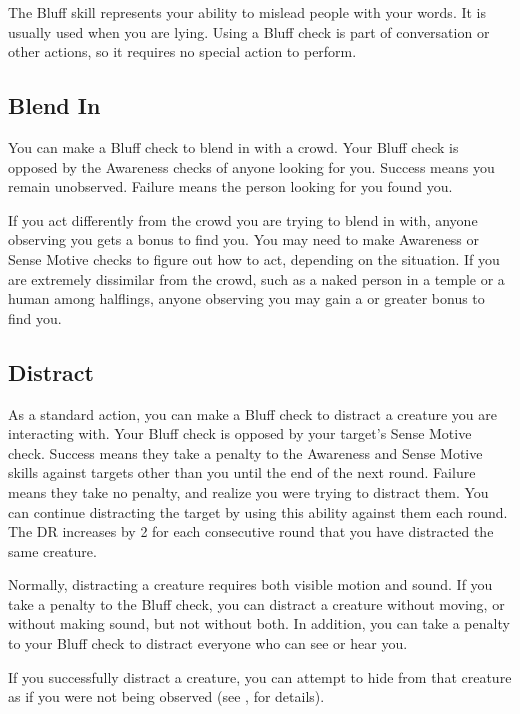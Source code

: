 \newpage
{}
        The Bluff skill represents your ability to mislead people with your words. It is usually used when you are lying. Using a Bluff check is part of conversation or other actions, so it requires no special action to perform.

    \subsection{Blend In}
        You can make a Bluff check to blend in with a crowd. Your Bluff check is opposed by the Awareness checks of anyone looking for you. Success means you remain unobserved. Failure means the person looking for you found you.

        If you act differently from the crowd you are trying to blend in with, anyone observing you gets a  bonus to find you. You may need to make Awareness or Sense Motive checks to figure out how to act, depending on the situation. If you are extremely dissimilar from the crowd, such as a naked person in a temple or a human among halflings, anyone observing you may gain a  or greater bonus to find you.

    \subsection{Distract}\label{Distract}
        As a standard action, you can make a Bluff check to distract a creature you are interacting with.
        Your Bluff check is opposed by your target's Sense Motive check.
        Success means they take a  penalty to the Awareness and Sense Motive skills against targets other than you until the end of the next round.
        Failure means they take no penalty, and realize you were trying to distract them.
        You can continue distracting the target by using this ability against them each round.
        The DR increases by 2 for each consecutive round that you have distracted the same creature.

        Normally, distracting a creature requires both visible motion and sound.
        If you take a  penalty to the Bluff check, you can distract a creature without moving, or without making sound, but not without both.
        In addition, you can take a  penalty to your Bluff check to distract everyone who can see or hear you.

        If you successfully distract a creature, you can attempt to hide from that creature as if you were not being observed (see , for details).

